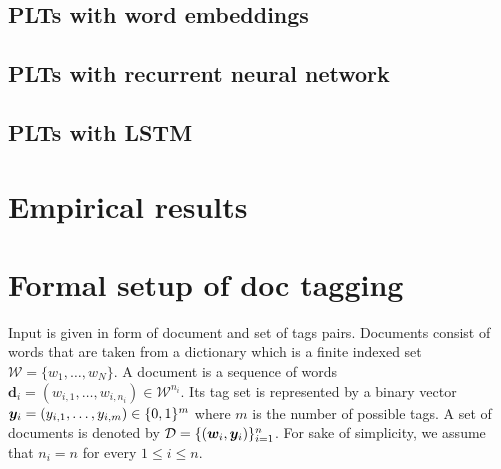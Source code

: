 \documentclass{article}
\newcommand{\cD}{\mathcal{D}}
\newcommand{\bd}{\mathbf{d}}
\newcommand{\calW}{\mathcal{W}}
\newcommand{\sectionBefore}{-0pt}
\newcommand{\sectionAfter}{-0pt}
\begin{document}
\vspace{\sectionBefore}
\subsection{PLTs with word embeddings}
\label{sec:sparse_input}
\vspace{\sectionAfter}


\vspace{\sectionBefore}
\subsection{PLTs with recurrent neural network}
\label{sec:sparse_input}
\vspace{\sectionAfter}


\vspace{\sectionBefore}
\subsection{PLTs with LSTM}
\label{sec:sparse_input}
\vspace{\sectionAfter}


\vspace{\sectionBefore}
\section{Empirical results}
\label{sec:empirical_results}
\vspace{\sectionAfter}





\vspace{\sectionBefore}
\section{Formal setup of doc tagging}
\label{sec:formal}
\vspace{\sectionAfter}


Input is given in form of document and set of tags pairs. Documents consist of words that are taken from a dictionary which is a finite indexed set $\calW = \{ w_1, \dots , w_N \}$. A document is a sequence of words  $\bd_i = (w_{i,1}, \dots, w_{i,n_i})\in \calW^{n_i}$. Its tag set is represented  by a binary vector $\boldsymbol{y}_i = (y_{i,1}, \ldots, y_{i,m}) \in \{ 0 , 1 \}^m$ where $m$ is the number of possible tags. A set of documents is denoted by $\cD = \{ (\bw_i, \by_{i}) \}_{i=1}^n$. For sake of simplicity, we assume that $n_i = n$ for every $1\le i \le n$.
\end{document}
